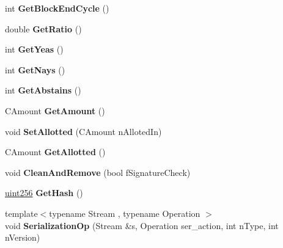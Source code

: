 \begin{DoxyCompactItemize}
\item 
\mbox{\label{class_c_budget_proposal_afe85ba7619fe2bf636e063550769a006}} 
int {\bfseries Get\+Block\+End\+Cycle} ()
\item 
\mbox{\label{class_c_budget_proposal_aef844b5ab211003e6b93bef75a20da6e}} 
double {\bfseries Get\+Ratio} ()
\item 
\mbox{\label{class_c_budget_proposal_afa25c9e366bff2c00ba488ce5d89e0d1}} 
int {\bfseries Get\+Yeas} ()
\item 
\mbox{\label{class_c_budget_proposal_a25210a8820448464f88721937b4570a5}} 
int {\bfseries Get\+Nays} ()
\item 
\mbox{\label{class_c_budget_proposal_aae864c01295cb5f0c8d0fc621b512300}} 
int {\bfseries Get\+Abstains} ()
\item 
\mbox{\label{class_c_budget_proposal_a2053aad4bd3c03675edf6f1ae60fff39}} 
C\+Amount {\bfseries Get\+Amount} ()
\item 
\mbox{\label{class_c_budget_proposal_a23188288e26d836dd95c77ee40d2e18e}} 
void {\bfseries Set\+Allotted} (C\+Amount n\+Alloted\+In)
\item 
\mbox{\label{class_c_budget_proposal_aa331bf9bfe44113a3a3ef2880b5f7936}} 
C\+Amount {\bfseries Get\+Allotted} ()
\item 
\mbox{\label{class_c_budget_proposal_a32204943f3efff468bcf76a92d014424}} 
void {\bfseries Clean\+And\+Remove} (bool f\+Signature\+Check)
\item 
\mbox{\label{class_c_budget_proposal_a7c69d6e50ef8c4870ab5af71d37ae2b7}} 
\mbox{\hyperlink{classuint256}{uint256}} {\bfseries Get\+Hash} ()
\item 
\mbox{\label{class_c_budget_proposal_a583bd01ff4267cf5491033ab57a09094}} 
{\footnotesize template$<$typename Stream , typename Operation $>$ }\\void {\bfseries Serialization\+Op} (Stream \&s, Operation ser\+\_\+action, int n\+Type, int n\+Version)
\end{DoxyCompactItemize}
